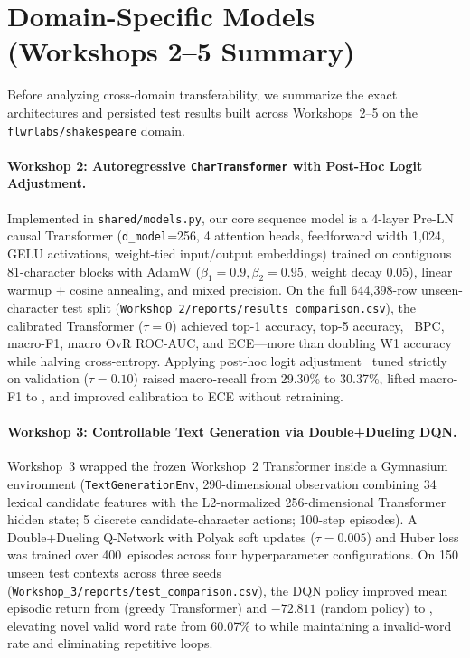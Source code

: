 \section{Domain-Specific Models (Workshops 2--5 Summary)}
\label{sec:domain_models}

Before analyzing cross-domain transferability, we summarize the exact architectures and persisted test results built across Workshops~2--5 on the \texttt{flwrlabs/shakespeare} domain.

\paragraph{Workshop 2: Autoregressive \texttt{CharTransformer} with Post-Hoc Logit Adjustment.}
Implemented in \texttt{shared/models.py}, our core sequence model is a 4-layer Pre-LN causal Transformer (\texttt{d\_model}=256, 4 attention heads, feedforward width 1,024, GELU activations, weight-tied input/output embeddings) trained on contiguous 81-character blocks with AdamW ($\beta_1=0.9, \beta_2=0.95$, weight decay 0.05), linear warmup + cosine annealing, and mixed precision. On the full 644,398-row unseen-character test split (\texttt{Workshop\_2/reports/results\_comparison.csv}), the calibrated Transformer ($\tau=0$) achieved \WTwoCalAcc{} top-1 accuracy, \WTwoCalTopFive{} top-5 accuracy, \WTwoCalBPC{}~BPC, \WTwoCalFOne{} macro-F1, \WTwoCalAUC{} macro OvR ROC-AUC, and \WTwoCalECE{} ECE—more than doubling W1 accuracy while halving cross-entropy. Applying post-hoc logit adjustment~\cite{Menon2020long} tuned strictly on validation ($\tau=0.10$) raised macro-recall from 29.30\% to 30.37\%, lifted macro-F1 to \WTwoAdjFOne{}, and improved calibration to \WTwoAdjECE{} ECE without retraining.

\paragraph{Workshop 3: Controllable Text Generation via Double+Dueling DQN.}
Workshop~3 wrapped the frozen Workshop~2 Transformer inside a Gymnasium environment (\texttt{TextGenerationEnv}, 290-dimensional observation combining 34 lexical candidate features with the L2-normalized 256-dimensional Transformer hidden state; 5 discrete candidate-character actions; 100-step episodes). A Double+Dueling Q-Network with Polyak soft updates ($\tau=0.005$) and Huber loss was trained over 400~episodes across four hyperparameter configurations. On 150 unseen test contexts across three seeds (\texttt{Workshop\_3/reports/test\_comparison.csv}), the DQN policy improved mean episodic return from \WThreeGreedyReturn{} (greedy Transformer) and $-72.811$ (random policy) to \textbf{\WThreeDQNReturn{}}, elevating novel valid word rate from 60.07\% to \WThreeDQNNewWord{} while maintaining a \WThreeDQNInvalid{} invalid-word rate and eliminating repetitive loops.

